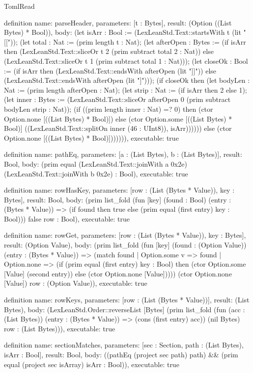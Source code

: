 \begin{lexlean}{TomlRead}
\begin{semanticmodule}
definition{
  name: parseHeader,
  parameters: [t : Bytes],
  result: (Option ((List Bytes) * Bool)),
  body: (let isArr : Bool := (LexLeanStd.Text::startsWith t (lit "[[")); (let total : Nat := (prim length t : Nat); (let afterOpen : Bytes := (if isArr then (LexLeanStd.Text::sliceOr t 2 (prim subtract total 2 : Nat)) else (LexLeanStd.Text::sliceOr t 1 (prim subtract total 1 : Nat))); (let closeOk : Bool := (if isArr then (LexLeanStd.Text::endsWith afterOpen (lit "]]")) else (LexLeanStd.Text::endsWith afterOpen (lit "]"))); (if closeOk then (let bodyLen : Nat := (prim length afterOpen : Nat); (let strip : Nat := (if isArr then 2 else 1); (let inner : Bytes := (LexLeanStd.Text::sliceOr afterOpen 0 (prim subtract bodyLen strip : Nat)); (if ((prim length inner : Nat) =? 0) then (ctor Option.none [((List Bytes) * Bool)]) else (ctor Option.some [((List Bytes) * Bool)] ((LexLeanStd.Text::splitOn inner (46 : UInt8)), isArr)))))) else (ctor Option.none [((List Bytes) * Bool)])))))),
  executable: true
}

definition{
  name: pathEq,
  parameters: [a : (List Bytes), b : (List Bytes)],
  result: Bool,
  body: (prim equal (LexLeanStd.Text::joinWith a 0x2e) (LexLeanStd.Text::joinWith b 0x2e) : Bool),
  executable: true
}

definition{
  name: rowHasKey,
  parameters: [row : (List (Bytes * Value)), key : Bytes],
  result: Bool,
  body: (prim list_fold (fun [key] (found : Bool) (entry : (Bytes * Value)) => (if found then true else (prim equal (first entry) key : Bool))) false row : Bool),
  executable: true
}

definition{
  name: rowGet,
  parameters: [row : (List (Bytes * Value)), key : Bytes],
  result: (Option Value),
  body: (prim list_fold (fun [key] (found : (Option Value)) (entry : (Bytes * Value)) => (match found
    | Option.some v => found
    | Option.none => (if (prim equal (first entry) key : Bool) then (ctor Option.some [Value] (second entry)) else (ctor Option.none [Value])))) (ctor Option.none [Value]) row : (Option Value)),
  executable: true
}

definition{
  name: rowKeys,
  parameters: [row : (List (Bytes * Value))],
  result: (List Bytes),
  body: (LexLeanStd.Order::reverseList [Bytes] (prim list_fold (fun (acc : (List Bytes)) (entry : (Bytes * Value)) => (cons (first entry) acc)) (nil Bytes) row : (List Bytes))),
  executable: true
}

definition{
  name: sectionMatches,
  parameters: [sec : Section, path : (List Bytes), isArr : Bool],
  result: Bool,
  body: ((pathEq (project sec path) path) && (prim equal (project sec isArray) isArr : Bool)),
  executable: true
}


\end{semanticmodule}
\end{lexlean}
